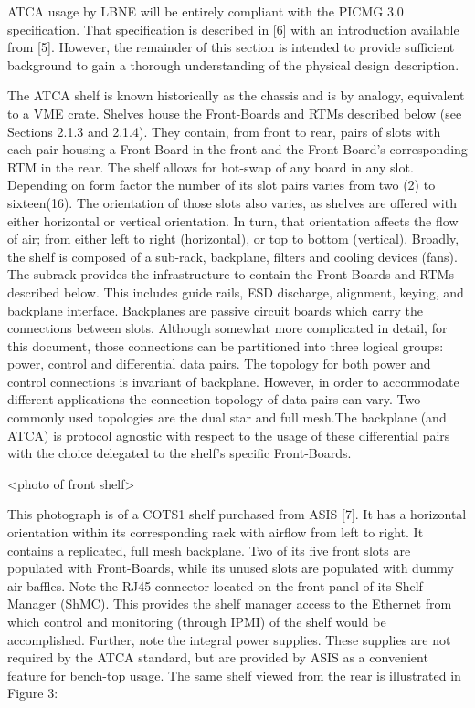 ATCA usage by LBNE will be entirely compliant with the PICMG 3.0 specification. That specification is described in [6] with an introduction available from [5]. However, the remainder of this section is intended to provide sufficient background to gain a thorough understanding of the physical design description.

The ATCA shelf is known historically as the chassis and is by analogy, equivalent to a VME crate. Shelves house the Front-Boards and RTMs described below (see Sections 2.1.3 and 2.1.4). They contain, from front to rear, pairs of slots with each pair housing a Front-Board in the front and the Front-Board's corresponding RTM in the rear. The shelf allows for hot-swap of any board in any slot. Depending on form factor the number of its slot pairs varies from two (2) to sixteen(16). The orientation of those slots also varies, as shelves are offered with either horizontal or vertical orientation. In turn, that orientation affects the flow of air; from either left to right (horizontal), or top to bottom (vertical).
Broadly, the shelf is composed of a sub-rack, backplane, filters and cooling devices (fans). The subrack provides the infrastructure to contain the Front-Boards and RTMs described below. This includes guide rails, ESD discharge, alignment, keying, and backplane interface. Backplanes are passive circuit boards which carry the connections between slots. Although somewhat more complicated in detail, for this document, those connections can be partitioned into three logical groups: power, control and differential data pairs. The topology for both power and control connections is invariant of backplane. However, in order to accommodate different applications the connection topology of data pairs can vary. Two commonly used topologies are the dual star and full mesh.The backplane (and ATCA) is protocol agnostic with respect to the usage of these differential pairs with the choice delegated to the shelf's specific Front-Boards.

<photo of  front shelf>

This photograph is of a COTS1 shelf purchased from ASIS [7]. It has a horizontal orientation within its corresponding rack with airflow from left to right. It contains a replicated, full mesh backplane. Two of its five front slots are populated with Front-Boards, while its unused slots are populated with dummy air baffles. Note the RJ45 connector located on the front-panel of its Shelf-Manager (ShMC). This provides the shelf manager access to the Ethernet from which control and monitoring (through IPMI) of the shelf would be accomplished. Further, note the integral power supplies. These supplies are not required by the ATCA standard, but are provided by ASIS as a convenient feature for bench-top usage. The same shelf viewed from the rear is illustrated in Figure 3:

